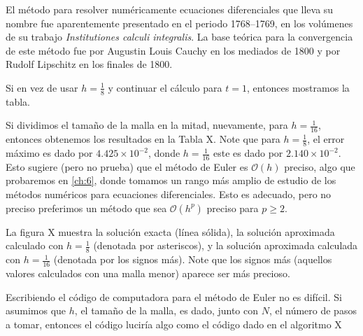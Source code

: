 {El método para resolver numéricamente ecuaciones diferenciales que lleva su nombre fue aparentemente presentado en el periodo 1768--1769, en los volúmenes de su trabajo \emph{Institutiones calculi integralis}. La base teórica para la convergencia de este método fue %
por Augustin Louis Cauchy en los mediados de 1800 y por Rudolf Lipschitz en los finales de 1800.
}

Si en vez de usar $h=\frac{1}{8}$ y continuar el cálculo para $t=1$, entonces mostramos la tabla.

Si dividimos el tamaño de la malla en la mitad, nuevamente, para $h=\frac{1}{16}$, entonces obtenemos los resultados en la Tabla X. Note que para $h=\frac{1}{8}$, el error máximo es dado por $4.425\times 10^{-2}$, donde $h=\frac{1}{16}$ este es dado por $2.140\times10^{-2}$. Esto sugiere (pero no prueba) que el método de Euler es $\mathcal{O}\left(h\right)$ preciso, algo que probaremos en \autoref{ch:6}, donde tomamos un rango más amplio de estudio de los métodos numéricos para ecuaciones diferenciales. Esto es adecuado, pero no preciso %
preferimos un método que sea $\mathcal{O}\left(h^{p}\right)$ preciso para $p\geq2.$

La figura X muestra la solución exacta (línea sólida), la solución aproximada calculado con $h=\frac{1}{8}$ (denotada por asteriscos), y la solución aproximada calculada con $h=\frac{1}{16}$ (denotada por los signos más). Note que los signos más (aquellos valores calculados con una malla menor) aparece ser más precioso.

Escribiendo el código de computadora para el método de Euler no es difícil. Si asumimos que $h$, el tamaño de la malla, es dado, junto con $N$, el número de pasos a tomar, entonces el código luciría algo como el código dado en el algoritmo X

\newpage

